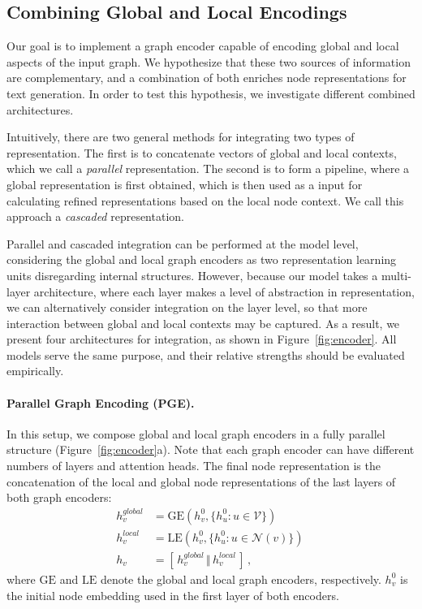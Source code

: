 \documentclass[11pt,a4paper]{article}
\begin{document}
 



\subsection{Combining Global and Local Encodings}
\label{sec:combiningenc}

Our goal is to implement a graph encoder capable of encoding global and local aspects of the input graph. We hypothesize that these two sources of information are complementary, and a combination of both enriches node representations for text generation. In order to test this hypothesis, we investigate different combined architectures. 



Intuitively, there are two general methods for integrating two types of representation. The first is to concatenate vectors of global and local contexts, which we call a {\it parallel} representation. The second is to form a pipeline, where a global representation is first obtained, which is then used as a input for calculating refined representations based on the local node context. We call this approach a {\it cascaded} representation. 

Parallel and cascaded integration can be performed at the model level, considering the global and local graph encoders as two representation learning units disregarding internal structures. However, because our model takes a multi-layer architecture, where each layer makes a level of abstraction in representation, we can alternatively consider integration on the layer level, so that more interaction between global and local contexts may be captured. As a result, we present four architectures for integration, as shown in Figure~\ref{fig:encoder}. All models serve the same purpose, and their relative strengths should be evaluated empirically.

\paragraph{Parallel Graph Encoding (PGE).} In this setup, we compose global and local graph encoders in a fully parallel structure (Figure~\ref{fig:encoder}a). Note that each graph encoder can have different numbers of layers and attention heads. The final node representation is the concatenation of the local and global node representations of the last layers of both graph encoders:
\begin{align}
h^{global}_{v} &= \textrm{GE} (h^{0}_v, \{ h^{0}_u : u \in \mathcal{V} \}) \, \nonumber \\
h^{local}_{v} &= \textrm{LE} (h^{0}_v, \{ h^{0}_u : u \in \mathcal{N}(v) \}) \, \nonumber \\
h_{v} &= [ \, h^{global}_{v} \, \Vert \, h^{local}_{v} \, ] \, ,
\end{align}
where $\textrm{GE}$ and $\textrm{LE}$ denote the global and local graph encoders, respectively. $h^{0}_v$ is the initial node embedding used in the first layer of both encoders.
\end{document}
